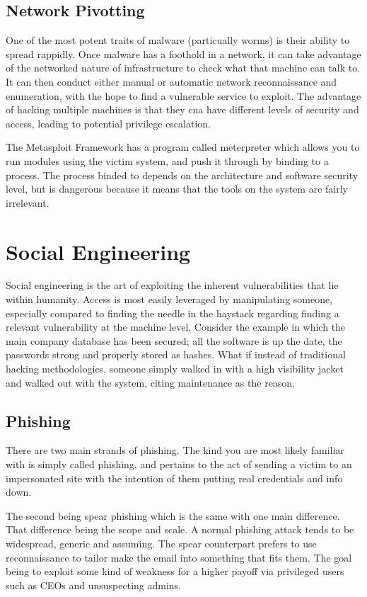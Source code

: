 \subsection{Network Pivotting}
One of the most potent traits of malware (particually worms) is their ability to spread rappidly. Once malware has a foothold in a network, it can take advantage of the networked nature of infrastructure to check what that machine can talk to.
It can then conduct either manual or automatic network reconnaissance and enumeration, with the hope to find a vulnerable service to exploit. The advantage of hacking multiple machines is that they cna have different levels of security and access, 
leading to potential privilege escalation. 

The Metasploit Framework has a program called meterpreter which allows you to run modules using the victim system, and push it through by binding to a process. The process binded to depends on the architecture and software security level, but is dangerous
because it means that the tools on the system are fairly irrelevant. 

\section{Social Engineering}
Social engineering is the art of exploiting the inherent vulnerabilities that lie within humanity. Access is most easily leveraged by manipulating someone, especially compared to finding the needle in the haystack regarding finding a relevant vulnerability at the machine level. 
Consider the example in which the main company database has been secured; all the software is up the date, the passwords strong and properly stored as hashes. What if instead of traditional hacking methodologies, someone simply walked in with a high visibility jacket and walked out with the system, 
citing maintenance as the reason. \citep{AssignmentSecurityForensicsPaper}



\subsection{Phishing}

There are two main strands of phishing. The kind you are most likely familiar with is simply called phishing, and pertains to the act of sending a victim to an impersonated site with the intention of them putting real credentials and info down. 

The second being spear phishing which is the same with one main difference. That difference being the scope and scale. A normal phishing attack tends to be widespread, generic and assuming. The spear counterpart prefers to use reconnaissance to tailor make the email into something that fits them. The goal being to exploit some kind of weakness for a higher payoff via privileged users such as CEOs and unsuspecting admins.

